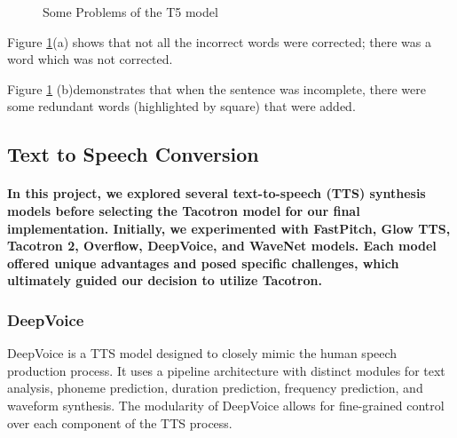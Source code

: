 \begin{enumerate}
\begin{figure}
\caption{Some Problems of the T5 model}
\label{fig:t5} 
\end{figure}

Figure \ref{fig:t5}(a) shows that not all the incorrect words were corrected; there was a word which was not corrected.

Figure \ref{fig:t5} (b)demonstrates that when the sentence was incomplete, there were some redundant words (highlighted by square) that were added. 

    
\end{enumerate}

\subsection{Text to Speech Conversion}
\paragraph{In this project, we explored several text-to-speech (TTS) synthesis models before selecting the Tacotron model for our final implementation. Initially, we experimented with FastPitch, Glow TTS, Tacotron 2, Overflow, DeepVoice, and WaveNet models. Each model offered unique advantages and posed specific challenges, which ultimately guided our decision to utilize Tacotron.}


\subsubsection{DeepVoice}

DeepVoice is a TTS model designed to closely mimic the human speech production process. It uses a pipeline architecture with distinct modules for text analysis, phoneme prediction, duration prediction, frequency prediction, and waveform synthesis. The modularity of DeepVoice allows for fine-grained control over each component of the TTS process.

